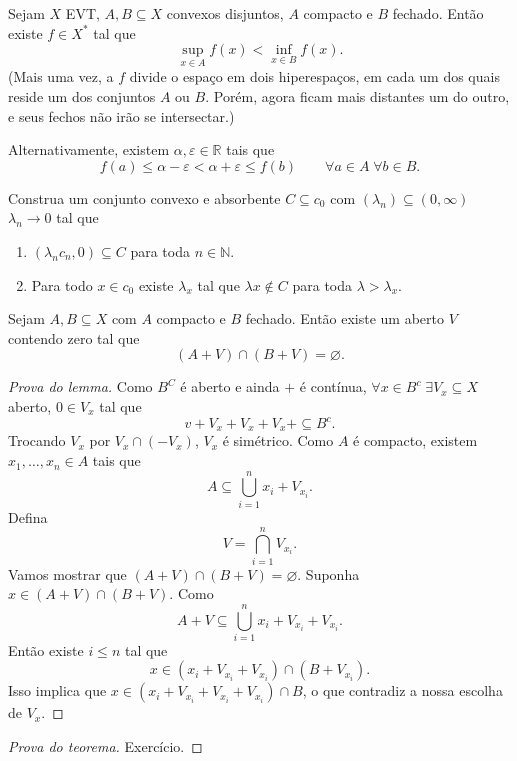 \documentclass[portuguese]{article}
\theoremstyle{definition}
\newcommand{\R}{\mathbb{R}}
\newcommand{\N}{\mathbb{N}}
\begin{document}
	\begin{teo}
		Sejam $X$ EVT, $A,B\subseteq X$ convexos disjuntos, $A$ compacto e $B$ fechado. Então existe $f\in X^*$ tal que
		\[\sup_{x\in A}f(x)<\inf_{x\in B}f(x).\]
		(Mais uma vez, a $f$ divide o espaço em dois hiperespaços, em cada um dos quais reside um dos conjuntos $A$ ou $B$. Porém, agora ficam mais distantes um do outro, e seus fechos não irão se intersectar.)
		
		Alternativamente, existem $\alpha,\varepsilon\in\R$ tais que 
		\[f(a)\leq \alpha-\varepsilon<\alpha+\varepsilon\leq f(b)\qquad\forall a\in A\;\forall b\in B.\]
	\end{teo}
	\begin{exer*}
		Construa um conjunto convexo e absorbente $C\subseteq c_0$ com $(\lambda_n)\subseteq (0,\infty)$ $\lambda_n\to0$ tal que
		\begin{enumerate}
			\item $(\lambda_nc_n,0)\subseteq C$ para toda $n\in\N$.
			\item Para todo $x\in c_0$ existe $\lambda_x$ tal que $\lambda x\notin C$ para toda $\lambda>\lambda_x$.
		\end{enumerate}
	\end{exer*}
	\begin{lema}
		Sejam $A,B\subseteq X$ com $A$ compacto e $B$ fechado. Então existe um aberto $V$ contendo zero tal que
		\[(A+V)\cap(B+V)=\varnothing.\]
	\end{lema}
	\begin{proof}[Prova do lemma]
		Como $B^C$ é aberto e ainda $+$ é contínua, $\forall x\in B^c\;\exists V_x\subseteq X$ aberto, $0\in V_x$ tal que
		\[v+V_x+V_x+V_x+\subseteq B^c.\]
		Trocando $V_x$ por $V_x\cap(-V_x)$, $V_x$ é simétrico. Como $A$ é compacto, existem $x_1,\ldots,x_n\in A$ tais que
		\[A\subseteq\bigcup_{i=1}^nx_i+V_{x_i}.\]
		Defina
		\[V=\bigcap_{i=1}^nV_{x_i}.\]
		Vamos mostrar que $(A+V)\cap(B+V)=\varnothing$. Suponha $x\in (A+V)\cap(B+V)$. Como
		\[A+V\subseteq \bigcup_{i=1}^nx_i+V_{x_i}+V_{x_i}.\]
		Então existe $i\leq n$ tal que
		\[x\in(x_i+V_{x_i}+V_{x_i})\cap(B+V_{x_i}).\]
		Isso implica que $x\in (x_i+V_{x_i}+V_{x_i}+V_{x_i})\cap B$, o que contradiz a nossa escolha de $V_x$.
	\end{proof}
	\begin{proof}[Prova do teorema]
		Exercício.
	\end{proof}
	
\end{document}
